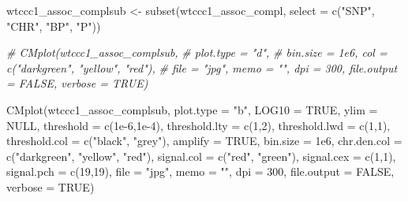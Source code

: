 \documentclass[
]{book}
\newenvironment{Shaded}{\begin{snugshade}}{\end{snugshade}}
\newcommand{\AttributeTok}[1]{\textcolor[rgb]{0.77,0.63,0.00}{#1}}
\newcommand{\CommentTok}[1]{\textcolor[rgb]{0.56,0.35,0.01}{\textit{#1}}}
\newcommand{\ConstantTok}[1]{\textcolor[rgb]{0.00,0.00,0.00}{#1}}
\newcommand{\DecValTok}[1]{\textcolor[rgb]{0.00,0.00,0.81}{#1}}
\newcommand{\FloatTok}[1]{\textcolor[rgb]{0.00,0.00,0.81}{#1}}
\newcommand{\FunctionTok}[1]{\textcolor[rgb]{0.00,0.00,0.00}{#1}}
\newcommand{\NormalTok}[1]{#1}
\newcommand{\OtherTok}[1]{\textcolor[rgb]{0.56,0.35,0.01}{#1}}
\newcommand{\StringTok}[1]{\textcolor[rgb]{0.31,0.60,0.02}{#1}}
\begin{document}
\begin{Shaded}
\begin{Highlighting}[]
\NormalTok{wtccc1\_assoc\_complsub }\OtherTok{\textless{}{-}} \FunctionTok{subset}\NormalTok{(wtccc1\_assoc\_compl, }\AttributeTok{select =} \FunctionTok{c}\NormalTok{(}\StringTok{"SNP"}\NormalTok{, }\StringTok{"CHR"}\NormalTok{, }\StringTok{"BP"}\NormalTok{, }\StringTok{"P"}\NormalTok{))}
\end{Highlighting}
\end{Shaded}

\begin{Shaded}
\begin{Highlighting}[]
\CommentTok{\# CMplot(wtccc1\_assoc\_complsub,}
\CommentTok{\#        plot.type = "d",}
\CommentTok{\#        bin.size = 1e6, col = c("darkgreen", "yellow", "red"),}
\CommentTok{\#        file = "jpg", memo = "", dpi = 300, file.output = FALSE, verbose = TRUE)}

\FunctionTok{CMplot}\NormalTok{(wtccc1\_assoc\_complsub,}
       \AttributeTok{plot.type =} \StringTok{"b"}\NormalTok{, }\AttributeTok{LOG10 =} \ConstantTok{TRUE}\NormalTok{, }\AttributeTok{ylim =} \ConstantTok{NULL}\NormalTok{,}
       \AttributeTok{threshold =} \FunctionTok{c}\NormalTok{(}\FloatTok{1e{-}6}\NormalTok{,}\FloatTok{1e{-}4}\NormalTok{), }\AttributeTok{threshold.lty =} \FunctionTok{c}\NormalTok{(}\DecValTok{1}\NormalTok{,}\DecValTok{2}\NormalTok{), }\AttributeTok{threshold.lwd =} \FunctionTok{c}\NormalTok{(}\DecValTok{1}\NormalTok{,}\DecValTok{1}\NormalTok{), }\AttributeTok{threshold.col =} \FunctionTok{c}\NormalTok{(}\StringTok{"black"}\NormalTok{, }\StringTok{"grey"}\NormalTok{),}
       \AttributeTok{amplify =} \ConstantTok{TRUE}\NormalTok{,}
       \AttributeTok{bin.size =} \FloatTok{1e6}\NormalTok{, }\AttributeTok{chr.den.col =} \FunctionTok{c}\NormalTok{(}\StringTok{"darkgreen"}\NormalTok{, }\StringTok{"yellow"}\NormalTok{, }\StringTok{"red"}\NormalTok{),}
       \AttributeTok{signal.col =} \FunctionTok{c}\NormalTok{(}\StringTok{"red"}\NormalTok{, }\StringTok{"green"}\NormalTok{), }\AttributeTok{signal.cex =} \FunctionTok{c}\NormalTok{(}\DecValTok{1}\NormalTok{,}\DecValTok{1}\NormalTok{), }\AttributeTok{signal.pch =} \FunctionTok{c}\NormalTok{(}\DecValTok{19}\NormalTok{,}\DecValTok{19}\NormalTok{),}
       \AttributeTok{file =} \StringTok{"jpg"}\NormalTok{, }\AttributeTok{memo =} \StringTok{""}\NormalTok{, }\AttributeTok{dpi =} \DecValTok{300}\NormalTok{, }\AttributeTok{file.output =} \ConstantTok{FALSE}\NormalTok{, }\AttributeTok{verbose =} \ConstantTok{TRUE}\NormalTok{)}
\end{Highlighting}
\end{Shaded}
\end{document}
